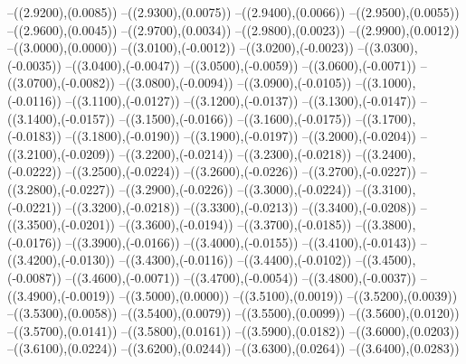 {	--({\sx*(2.9200)},{\sy*(0.0085)})
	--({\sx*(2.9300)},{\sy*(0.0075)})
	--({\sx*(2.9400)},{\sy*(0.0066)})
	--({\sx*(2.9500)},{\sy*(0.0055)})
	--({\sx*(2.9600)},{\sy*(0.0045)})
	--({\sx*(2.9700)},{\sy*(0.0034)})
	--({\sx*(2.9800)},{\sy*(0.0023)})
	--({\sx*(2.9900)},{\sy*(0.0012)})
	--({\sx*(3.0000)},{\sy*(0.0000)})
	--({\sx*(3.0100)},{\sy*(-0.0012)})
	--({\sx*(3.0200)},{\sy*(-0.0023)})
	--({\sx*(3.0300)},{\sy*(-0.0035)})
	--({\sx*(3.0400)},{\sy*(-0.0047)})
	--({\sx*(3.0500)},{\sy*(-0.0059)})
	--({\sx*(3.0600)},{\sy*(-0.0071)})
	--({\sx*(3.0700)},{\sy*(-0.0082)})
	--({\sx*(3.0800)},{\sy*(-0.0094)})
	--({\sx*(3.0900)},{\sy*(-0.0105)})
	--({\sx*(3.1000)},{\sy*(-0.0116)})
	--({\sx*(3.1100)},{\sy*(-0.0127)})
	--({\sx*(3.1200)},{\sy*(-0.0137)})
	--({\sx*(3.1300)},{\sy*(-0.0147)})
	--({\sx*(3.1400)},{\sy*(-0.0157)})
	--({\sx*(3.1500)},{\sy*(-0.0166)})
	--({\sx*(3.1600)},{\sy*(-0.0175)})
	--({\sx*(3.1700)},{\sy*(-0.0183)})
	--({\sx*(3.1800)},{\sy*(-0.0190)})
	--({\sx*(3.1900)},{\sy*(-0.0197)})
	--({\sx*(3.2000)},{\sy*(-0.0204)})
	--({\sx*(3.2100)},{\sy*(-0.0209)})
	--({\sx*(3.2200)},{\sy*(-0.0214)})
	--({\sx*(3.2300)},{\sy*(-0.0218)})
	--({\sx*(3.2400)},{\sy*(-0.0222)})
	--({\sx*(3.2500)},{\sy*(-0.0224)})
	--({\sx*(3.2600)},{\sy*(-0.0226)})
	--({\sx*(3.2700)},{\sy*(-0.0227)})
	--({\sx*(3.2800)},{\sy*(-0.0227)})
	--({\sx*(3.2900)},{\sy*(-0.0226)})
	--({\sx*(3.3000)},{\sy*(-0.0224)})
	--({\sx*(3.3100)},{\sy*(-0.0221)})
	--({\sx*(3.3200)},{\sy*(-0.0218)})
	--({\sx*(3.3300)},{\sy*(-0.0213)})
	--({\sx*(3.3400)},{\sy*(-0.0208)})
	--({\sx*(3.3500)},{\sy*(-0.0201)})
	--({\sx*(3.3600)},{\sy*(-0.0194)})
	--({\sx*(3.3700)},{\sy*(-0.0185)})
	--({\sx*(3.3800)},{\sy*(-0.0176)})
	--({\sx*(3.3900)},{\sy*(-0.0166)})
	--({\sx*(3.4000)},{\sy*(-0.0155)})
	--({\sx*(3.4100)},{\sy*(-0.0143)})
	--({\sx*(3.4200)},{\sy*(-0.0130)})
	--({\sx*(3.4300)},{\sy*(-0.0116)})
	--({\sx*(3.4400)},{\sy*(-0.0102)})
	--({\sx*(3.4500)},{\sy*(-0.0087)})
	--({\sx*(3.4600)},{\sy*(-0.0071)})
	--({\sx*(3.4700)},{\sy*(-0.0054)})
	--({\sx*(3.4800)},{\sy*(-0.0037)})
	--({\sx*(3.4900)},{\sy*(-0.0019)})
	--({\sx*(3.5000)},{\sy*(0.0000)})
	--({\sx*(3.5100)},{\sy*(0.0019)})
	--({\sx*(3.5200)},{\sy*(0.0039)})
	--({\sx*(3.5300)},{\sy*(0.0058)})
	--({\sx*(3.5400)},{\sy*(0.0079)})
	--({\sx*(3.5500)},{\sy*(0.0099)})
	--({\sx*(3.5600)},{\sy*(0.0120)})
	--({\sx*(3.5700)},{\sy*(0.0141)})
	--({\sx*(3.5800)},{\sy*(0.0161)})
	--({\sx*(3.5900)},{\sy*(0.0182)})
	--({\sx*(3.6000)},{\sy*(0.0203)})
	--({\sx*(3.6100)},{\sy*(0.0224)})
	--({\sx*(3.6200)},{\sy*(0.0244)})
	--({\sx*(3.6300)},{\sy*(0.0264)})
	--({\sx*(3.6400)},{\sy*(0.0283)})
}
